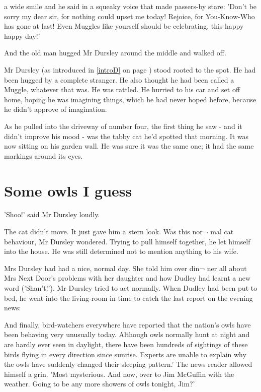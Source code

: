 \documentclass[twoside, openany]{report}
\begin{document}
a wide smile and he said in a squeaky voice that made passers-by 
stare: 'Don't be sorry my dear sir, for nothing could upset me 
today! Rejoice, for You-Know-Who has gone at last! Even 
Muggles like yourself should be celebrating, this happy happy 
day!' 

And the old man hugged Mr Dursley around the middle and 
walked off. 

Mr Dursley (as introduced in \ref{introD} on page \pageref{introD}) stood rooted to the spot. He had been hugged by a 
complete stranger. He also thought he had been called a Muggle, 
whatever that was. He was rattled. He hurried to his car and set 
off home, hoping he was imagining things, which he had never 
hoped before, because he didn't approve of imagination. 

As he pulled into the driveway of number four, the first thing he 
saw - and it didn't improve his mood - was the tabby cat he'd 
spotted that morning. It was now sitting on his garden wall. He was 
sure it was the same one; it had the same markings around its eyes. 

\section*{Some owls I guess}

'Shoo!' said Mr Dursley loudly. 

The cat didn't move. It just gave him a stern look. Was this nor¬ 
mal cat behaviour, Mr Dursley wondered. Trying to pull himself 
together, he let himself into the house. He was still determined 
not to mention anything to his wife. 

Mrs Dursley had had a nice, normal day. She told him over din¬ 
ner all about Mrs Next Door's problems with her daughter and 
how Dudley had learnt a new word ('Shan't!'). Mr Dursley tried to 
act normally. When Dudley had been put to bed, he went into the 
living-room in time to catch the last report on the evening news: 

And finally, bird-watchers everywhere have reported that the 
nation's owls have been behaving very unusually today. Although 
owls normally hunt at night and are hardly ever seen in daylight, 
there have been hundreds of sightings of these birds flying in 
every direction since sunrise. Experts are unable to explain why 
the owls have suddenly changed their sleeping pattern.' The news 
reader allowed himself a grin. 'Most mysterious. And now, over to 
Jim McGuffin with the weather. Going to be any more showers of 
owls tonight, Jim?' 
\end{document}
